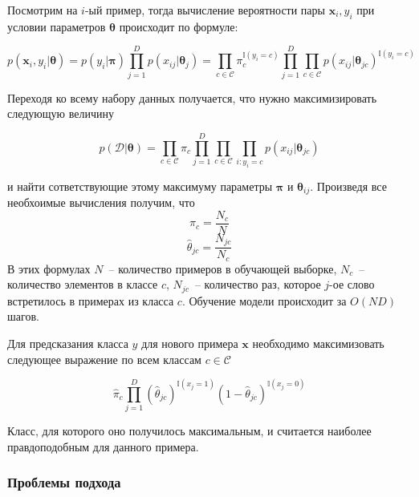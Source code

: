 Посмотрим на $i$-ый пример, тогда вычисление вероятности пары $\mathbf{x}_i, y_i$ при условии
параметров $\mathbf{\theta}$ происходит по формуле:

\begin{equation}
  p(\mathbf{x}_i, y_i|\mathbf{\theta})
  = p(y_i|\mathbf{\pi})\prod_{j=1}^Dp(x_{ij}|\mathbf{\theta}_j)
  = \prod_{c\in\mathcal{C}}\pi_c^{\mathbb{I}(y_i=c)}
    \prod_{j=1}^D\prod_{c\in\mathcal{C}}p(x_{ij}|\mathbf{\theta}_{jc})^{\mathbb{I}(y_i=c)}
  \label{eq:mle}
\end{equation}

Переходя ко всему набору данных получается, что нужно максимизировать следующую величину

\begin{equation}
  p(\mathcal{D}|\mathbf{\theta})
  = \prod_{c\in\mathcal{C}}\pi_c
    \prod_{j=1}^D\prod_{c\in\mathcal{C}}\prod_{i:y_i=c}p(x_{ij}|\mathbf{\theta}_{jc})
  \label{eq:mleD}
\end{equation}

и найти сответствующие этому максимуму параметры $\mathbf{\pi}$ и $\mathbf{\theta}_{ij}$. Произведя
все необхоимые вычисления получим, что
\begin{equation}
  \hat{\pi}_c = \frac{N_c}{N}
  \label{eq:pinb}
\end{equation}
\begin{equation}
  \hat{\theta}_{jc}= \frac{N_{jc}}{N_c}
  \label{eq:thetanb}
\end{equation}
В этих формулах $N$~-- количество примеров в обучающей выборке, $N_c$~--количество элементов в
классе $c$,
$N_{jc}$~-- количество раз, которое $j$-ое слово встретилось в примерах из класса $c$. Обучение
модели происходит за $O(ND)$ шагов.

Для предсказания класса $y$ для нового примера $\mathbf{x}$ необходимо максимизовать следующее
выражение по всем классам $c \in \mathcal{C}$

\begin{equation}
  \hat{\pi}_c\prod_{j=1}^D(\hat{\theta}_{jc})^{\mathbb{I}(x_j=1)}(1-\hat{\theta}_{jc})^{\mathbb{I}(x_j=0)}
  \label{eq:predict}
\end{equation}

Класс, для которого оно получилось максимальным, и считается наиболее правдоподобным для данного
примера.

\subsubsection{Проблемы подхода}

